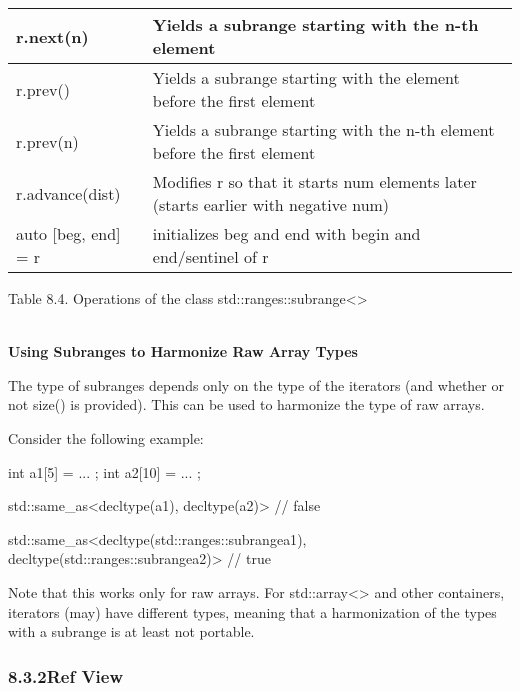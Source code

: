 \begin{table}[H]
\begin{tabular}{|l|l|}
	r.next(n)               & Yields a subrange starting with the n-th element                          \\ \hline
	r.prev()                & Yields a subrange starting with the element before the first element      \\ \hline
	r.prev(n)               & Yields a subrange starting with the n-th element before the first element \\ \hline
	r.advance(dist)                & Modifies r so that it starts num elements later (starts earlier with negative num)                       \\ \hline
	auto {[}beg, end{]} = r & initializes beg and end with begin and end/sentinel of r                  \\ \hline
\end{tabular}
\end{table}

\begin{center}
Table 8.4. Operations of the class std::ranges::subrange<>
\end{center}

\noindent
\hspace*{\fill} \\ %
\textbf{Using Subranges to Harmonize Raw Array Types}

The type of subranges depends only on the type of the iterators (and whether or not size() is provided).
This can be used to harmonize the type of raw arrays.

Consider the following example:

\begin{cpp}
int a1[5] = { ... };
int a2[10] = { ... };

std::same_as<decltype(a1), decltype(a2)> // false

std::same_as<decltype(std::ranges::subrange{a1}),
			 decltype(std::ranges::subrange{a2})> // true
\end{cpp}

Note that this works only for raw arrays. For std::array<> and other containers, iterators (may) have different types, meaning that a harmonization of the types with a subrange is at least not portable.

\subsubsection*{ 8.3.2\hspace{0.2cm}Ref View}

